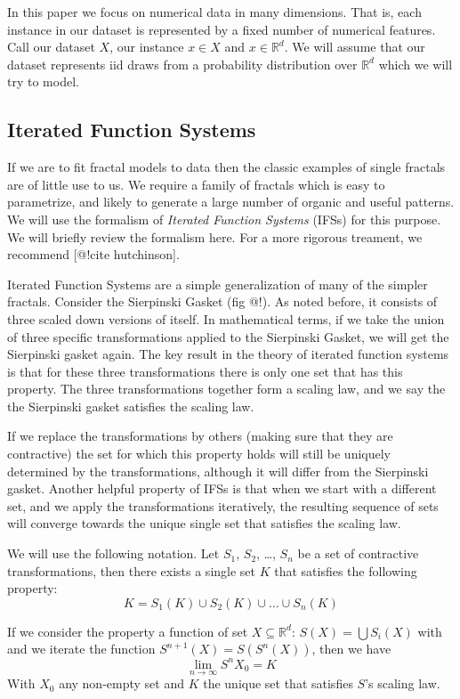 \documentclass[11pt, twocolumn]{article}
\theoremstyle{definition}
\begin{document}
In this paper we focus on numerical data in many dimensions. That is, each instance in our dataset is represented by a fixed number of numerical features. Call our dataset $X$, our instance $x \in X$ and $x \in {\mathbb R}^d$. We will assume that our dataset represents iid draws from a probability distribution over ${\mathbb R}^d$ which we will try to model.

\subsection{Iterated Function Systems}

If we are to fit fractal models to data then the classic examples of single fractals are of little use to us. We require a family of fractals which is easy to  
parametrize, and likely to generate a large number of organic and useful patterns. We will use the formalism of \emph{Iterated Function Systems} (IFSs) for this purpose. We will briefly review the formalism here. For a more rigorous treament, we recommend [@!cite hutchinson].

Iterated Function Systems are a simple generalization of many of the simpler fractals. Consider the Sierpinski Gasket (fig @!). As noted before, it consists of three scaled down versions of itself. In mathematical terms, if we take the union of three specific transformations applied to the Sierpinski Gasket, we will get the Sierpinski gasket again. The key result in the theory of iterated function systems is that for these three transformations there is only one set that has this property. The three transformations together form a scaling law, and we say the the Sierpinski gasket satisfies the scaling law.

If we replace the transformations by others (making sure that they are contractive) the set for which this property holds will still be uniquely determined by the transformations, although it will differ from the Sierpinski gasket. Another helpful property of IFSs is that when we start with a different set, and we apply the transformations iteratively, the resulting sequence of sets will converge towards the unique single set that satisfies the scaling law.

We will use the following notation. Let $S_1$, $S_2$, \ldots, $S_n$ be a set of contractive transformations, then there exists a single set $K$ that satisfies the following property:
\[
K = S_1(K) \cup S_2(K) \cup \ldots \cup S_n(K)
\] 

If we consider the property a function of set $X \subseteq {\mathbb R}^d$: $S(X) = \bigcup S_i(X)$ with and we iterate the function $S^{n+1}(X) = S(S^n(X))$, then we have 
\[
\lim_{n \rightarrow \infty} S^n{X_0} = K
\]
With $X_0$ any non-empty set and $K$ the unique set that satisfies $S$'s scaling law.
\end{document}
